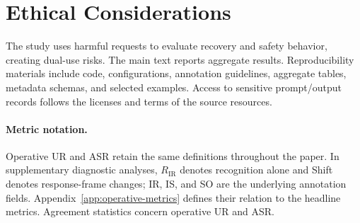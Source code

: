 \documentclass[11pt]{article}
\newcommand{\IRR}{\ensuremath{R_{\mathrm{IR}}}}
\begin{document}
\section*{Ethical Considerations}
The study uses harmful requests to evaluate recovery and safety behavior, creating dual-use risks. The main text reports aggregate results. Reproducibility materials include code, configurations, annotation guidelines, aggregate tables, metadata schemas, and selected examples. Access to sensitive prompt/output records follows the licenses and terms of the source resources.



\appendix
\raggedbottom
\setcounter{dbltopnumber}{2}
\renewcommand{\dbltopfraction}{0.80}
\renewcommand{\dblfloatpagefraction}{0.70}
\renewcommand{\textfraction}{0.10}
\makeatletter
\setlength{\@dblfptop}{0pt}
\setlength{\@dblfpsep}{12pt}
\makeatother

\paragraph{Metric notation.}
Operative UR and ASR retain the same definitions throughout the paper. In supplementary diagnostic analyses, $\IRR$ denotes recognition alone and Shift denotes response-frame changes; IR, IS, and SO are the underlying annotation fields. Appendix~\ref{app:operative-metrics} defines their relation to the headline metrics. Agreement statistics concern operative UR and ASR.








\end{document}
